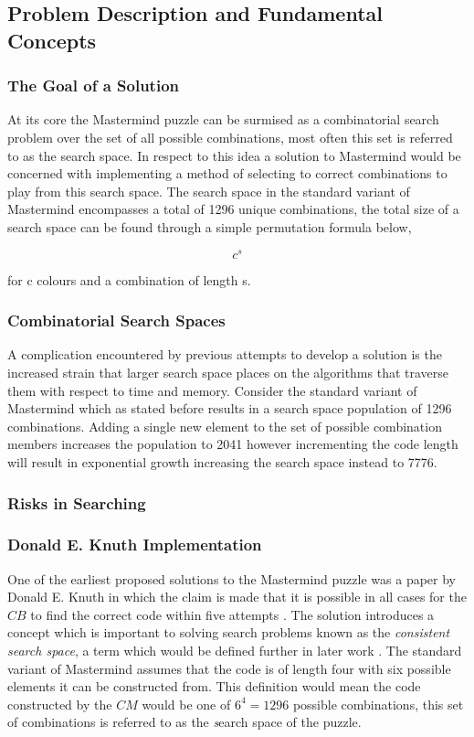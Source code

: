 \documentclass[12pt]{article}  %
\theoremstyle{definition}
\theoremstyle{remark}
\begin{document}
\subsection {Problem Description and Fundamental Concepts}

\subsubsection {The Goal of a Solution}
At its core the Mastermind puzzle can be surmised as a combinatorial search problem over the set of all possible combinations, most often this set is referred to as the search space. In respect to this idea a solution to Mastermind would be concerned with implementing a method of selecting to correct combinations to play from this search space. The search space in the standard variant of Mastermind encompasses a total of 1296 unique combinations, the total size of a search space can be found through a simple permutation formula below,

\[ c^s\]

for c colours and a combination of length s.

\subsubsection {Combinatorial Search Spaces}

A complication encountered by previous attempts to develop a solution is the increased strain that larger search space places on the algorithms that traverse them with respect to time and memory. Consider the standard variant of Mastermind which as stated before results in a search space population of 1296 combinations. Adding a single new element to the set of possible combination members increases the population to 2041 however incrementing the code length will result in exponential growth increasing the search space instead to 7776.


\subsubsection {Risks in Searching}

\subsubsection {Donald E. Knuth Implementation}

\par One of the earliest proposed solutions to the Mastermind puzzle was a paper by Donald E. Knuth in which the claim is made that it is possible in all cases for the $CB$ to find the correct code within five attempts \cite {Wolfram} \cite {Knuth}. The solution introduces a concept which is important to solving search problems known as the \emph{consistent search space}, a term which would be defined further in later work \cite{Merelo}. The standard variant of Mastermind assumes that the code is of length four with six possible elements it can be constructed from. This definition would mean the code constructed by the $CM$ would be one of $6^4 = 1296$ possible combinations, this set of combinations is referred to as the \emph search space of the puzzle. 
\end{document}
